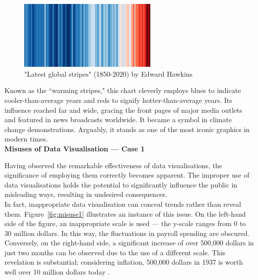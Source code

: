 \documentclass{article}\usepackage[]{graphicx}\usepackage[]{xcolor}
\numberwithin{equation}{section}
\begin{document}
\begin{figure}[H]
    \centering
    \includegraphics[width=0.6\textwidth]{image_reference/global.png}
    \caption{"Latest global stripes" (1850-2020) by Edward Hawkins}
    \label{fig:global}
\end{figure}

\noindent 
Known as the ``warming stripes," this chart cleverly employs blues to indicate cooler-than-average years and reds to signify hotter-than-average years. Its influence reached far and wide, gracing the front pages of major media outlets and featured in news broadcasts worldwide. It became a symbol in climate change demonstrations. Arguably, it stands as one of the most iconic graphics in modern times.\\

\noindent
\textbf{Misuses of Data Visualisation — Case 1}

\noindent
Having observed the remarkable effectiveness of data visualisations, the significance of employing them correctly becomes apparent. The improper use of data visualisations holds the potential to significantly influence the public in misleading ways, resulting in undesired consequences.\\

\noindent
In fact, inappropriate data visualisation can conceal trends rather than reveal them. Figure~\ref{fig:misuse1} \cite{lie} illustrates an instance of this issue. On the left-hand side of the figure, an inappropriate scale is used — the y-scale ranges from 0 to 30 million dollars. In this way, the fluctuations in payroll spending are obscured. Conversely, on the right-hand side, a significant increase of over 500,000 dollars in just two months can be observed due to the use of a different scale. This revelation is substantial; considering inflation, 500,000 dollars in 1937 is worth well over 10 million dollars today \cite{worth}.\\
\end{document}
